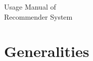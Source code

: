 \documentclass[12pt,a4paper]{article}
\begin{document}
    
    \begin{titlepage}
        \vspace*{\fill}
        \begin{center}
            {\Huge Usage Manual of\\Recommender System}
        \end{center}
        \vspace*{\fill}
    \end{titlepage}

    \newpage

    \tableofcontents

    \newpage

    \section{Generalities}
\end{document}
